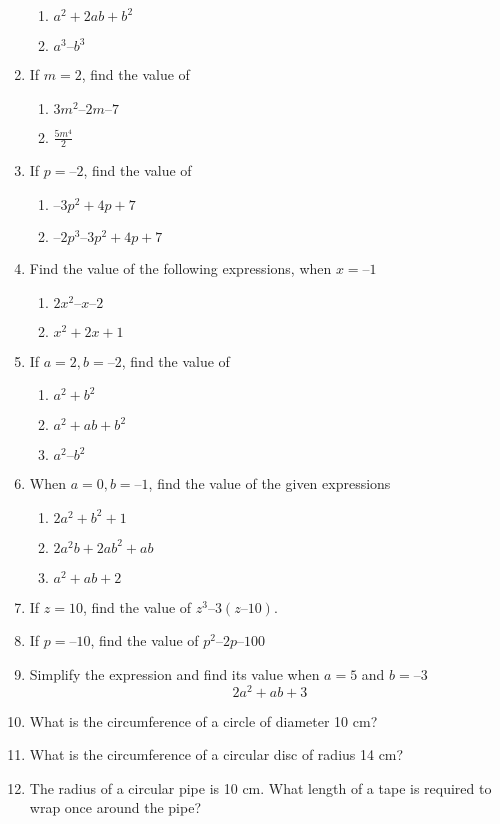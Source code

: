 \begin{enumerate}[label=\thesection.\arabic*, ref=\thesection.\theenumi]
	\begin{enumerate}
\item $ a^2+2ab+b^2$
\item $ a^3 – b^3$
\end{enumerate}
\item If $m = 2$, find the value of
	\begin{enumerate}
\item $ 3m^2 – 2m – 7 $
\item $ \frac{5m^4}{ 2}$
\end{enumerate}
\item  If $p = – 2$, find the value of
	\begin{enumerate}
\item  $– 3p^2 + 4p + 7 $
\item  $– 2p^3 – 3p^2 + 4p + 7$
\end{enumerate}
\item  Find the value of the following expressions, when $x = –1$ 
	\begin{enumerate}
\item $ 2x^2 – x – 2$
\item $ x^2 + 2x +1$
\end{enumerate}
\item  If $a = 2, b = – 2$, find the value of
	\begin{enumerate}
\item  $ a^2 + b^2$
\item  $a^2 + ab + b^2 $
\item  $a^2 – b^2$
\end{enumerate}
\item  When $a = 0, b = – 1$, find the value of the given expressions
	\begin{enumerate}
\item $2a^2 + b^2 + 1 $
\item $2a^2b + 2ab^2 + ab $
\item $a^2 + ab + 2$
\end{enumerate}
\item If $z = 10$, find the value of $z^3 – 3(z – 10)$. 
\item  If $p = – 10$, find the value of $p^2 – 2p – 100$
\item  Simplify the expression and find its value when $a = 5$ and $b = – 3$
	$$ 2a^2 + ab + 3 $$
\item What is the circumference of a circle of diameter 10 cm?
\item What is the circumference of a circular disc of radius 14 cm?
\item The radius of a circular pipe is 10 cm. What length of a tape is required to wrap once around the pipe?

\end{enumerate}
